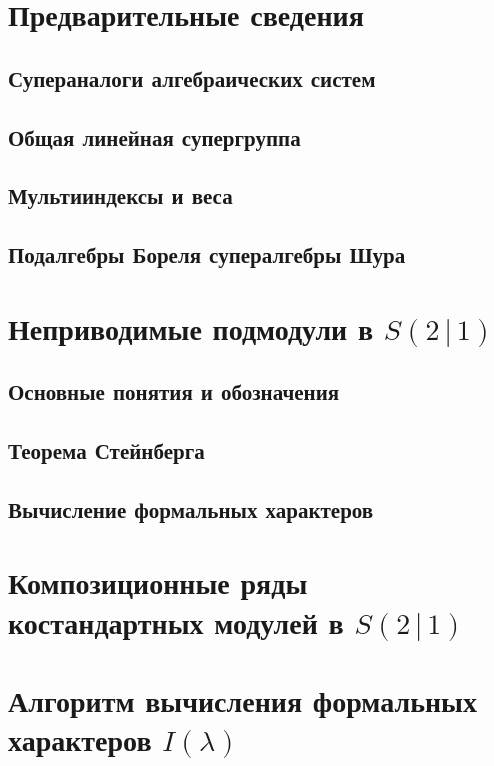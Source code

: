 \section{Предварительные сведения}
	\subsection{Супераналоги алгебраических систем}	
		
	\subsection{Общая линейная супергруппа}
		
	\subsection{Мультииндексы и веса}
		
	\subsection{Подалгебры Бореля супералгебры Шура}
		

%
\newpage
\section{Неприводимые подмодули в $S(2 \,|\, 1)$}
	\subsection{Основные понятия и обозначения}
		
	\subsection{Теорема Стейнберга}	
		
	\subsection{Вычисление формальных характеров}
		
		
%
\newpage
\section{Композиционные ряды костандартных модулей в $S(2 \,|\, 1)$}
	
%
\newpage
\section{Алгоритм вычисления формальных характеров $I(\lambda)$}
